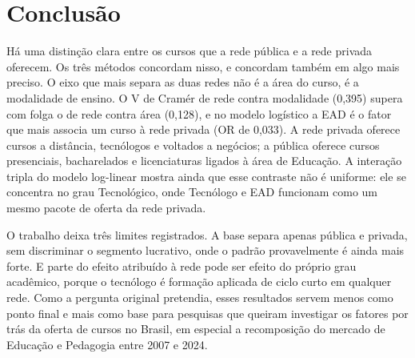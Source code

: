 \documentclass[12pt]{article}
\begin{document}
\section{Conclusão}
Há uma distinção clara entre os cursos que a rede pública e a rede privada oferecem. Os três métodos concordam nisso, e concordam também em algo mais preciso. O eixo que mais separa as duas redes não é a área do curso, é a modalidade de ensino. O V de Cramér de rede contra modalidade (0,395) supera com folga o de rede contra área (0,128), e no modelo logístico a EAD é o fator que mais associa um curso à rede privada (OR de 0,033). A rede privada oferece cursos a distância, tecnólogos e voltados a negócios; a pública oferece cursos presenciais, bacharelados e licenciaturas ligados à área de Educação. A interação tripla do modelo log-linear mostra ainda que esse contraste não é uniforme: ele se concentra no grau Tecnológico, onde Tecnólogo e EAD funcionam como um mesmo pacote de oferta da rede privada.

O trabalho deixa três limites registrados. A base separa apenas pública e privada, sem discriminar o segmento lucrativo, onde o padrão provavelmente é ainda mais forte. E parte do efeito atribuído à rede pode ser efeito do próprio grau acadêmico, porque o tecnólogo é formação aplicada de ciclo curto em qualquer rede. Como a pergunta original pretendia, esses resultados servem menos como ponto final e mais como base para pesquisas que queiram investigar os fatores por trás da oferta de cursos no Brasil, em especial a recomposição do mercado de Educação e Pedagogia entre 2007 e 2024.

\clearpage
\printbibliography
\end{document}
